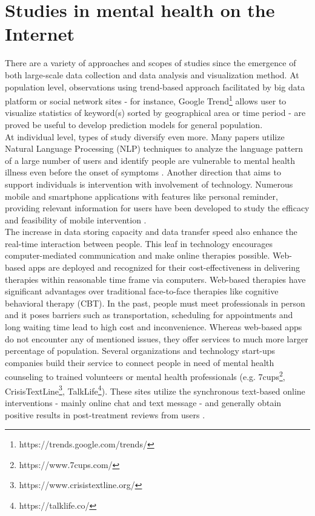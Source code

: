 \section{Studies in mental health on the Internet}
There are a variety of approaches and scopes of studies since the emergence of both large-scale data collection and data analysis and visualization method. At population level, observations using trend-based approach facilitated by big data platform or social network sites - for instance, Google Trend\footnote{https://trends.google.com/trends/ } allows user to visualize statistics of keyword(s) sorted by geographical area or time period \cite{Fond2015} - are proved be useful to develop prediction models for general population. \\
At individual level, types of study diversify even more. Many papers utilize Natural Language Processing (NLP) techniques to analyze the language pattern of a large number of users and identify people are vulnerable to mental health illness even before the onset of symptoms \cite{Almeida, DeChoudhury2013}. Another direction that aims to support individuals is intervention with involvement of technology. Numerous mobile and smartphone applications with features like personal reminder, providing relevant information for users have been developed to study the efficacy and feasibility of mobile intervention \cite{Rathbone2017}. \\
The increase in data storing capacity and data transfer speed also enhance the real-time interaction between people. This leaf in technology encourages computer-mediated communication and make online therapies possible. Web-based apps are deployed and recognized for their cost-effectiveness in delivering therapies within reasonable time frame via computers. Web-based therapies have significant advantages over traditional face-to-face therapies like cognitive behavioral therapy (CBT). In the past, people must meet professionals in person and it poses barriers such as transportation, scheduling for appointments and long waiting time lead to high cost and inconvenience. Whereas web-based apps do not encounter any of mentioned issues, they offer services to much more larger percentage of population. Several organizations and technology start-ups companies build their service to connect people in need of mental health counseling to trained volunteers or mental health professionals (e.g. 7cups\footnote{https://www.7cups.com/}, CrisisTextLine\footnote{https://www.crisistextline.org/}, TalkLife\footnote{https://talklife.co/}). These sites utilize the synchronous text-based online interventions - mainly online chat and text message - and generally obtain positive results in post-treatment reviews from users \cite{Hoermann2017}.\\
